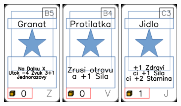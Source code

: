 \documentclass[a4paper]{article}
\begin{document}
	\includegraphics[width=3.0cm]{img-1_99}
	\includegraphics[width=3.0cm]{img-1_68}
	\includegraphics[width=3.0cm]{img-1_12}
\end{document}
